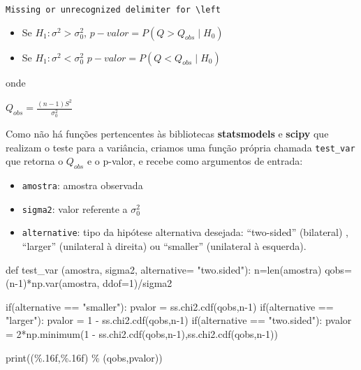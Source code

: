 \documentclass[
  letterpaper,
  DIV=11,
  numbers=noendperiod]{scrreprt}
\newenvironment{Shaded}{\begin{snugshade}}{\end{snugshade}}
\newcommand{\BuiltInTok}[1]{\textcolor[rgb]{0.00,0.23,0.31}{#1}}
\newcommand{\ControlFlowTok}[1]{\textcolor[rgb]{0.00,0.23,0.31}{#1}}
\newcommand{\DecValTok}[1]{\textcolor[rgb]{0.68,0.00,0.00}{#1}}
\newcommand{\KeywordTok}[1]{\textcolor[rgb]{0.00,0.23,0.31}{#1}}
\newcommand{\NormalTok}[1]{\textcolor[rgb]{0.00,0.23,0.31}{#1}}
\newcommand{\OperatorTok}[1]{\textcolor[rgb]{0.37,0.37,0.37}{#1}}
\newcommand{\SpecialCharTok}[1]{\textcolor[rgb]{0.37,0.37,0.37}{#1}}
\newcommand{\StringTok}[1]{\textcolor[rgb]{0.13,0.47,0.30}{#1}}
\providecommand{\tightlist}{%
  \setlength{\itemsep}{0pt}\setlength{\parskip}{0pt}}\usepackage{longtable,booktabs,array}
\begin{document}
\texttt{Missing\ or\ unrecognized\ delimiter\ for\ \textbackslash{}left}

\begin{itemize}
\item
  Se \(H_{1}: \sigma^{2} > \sigma^{2}_{0}\),
  \(p-valor = P (Q > Q_{obs}\mid H_{0})\)
\item
  Se \(H_{1}: \sigma^{2} < \sigma^{2}_{0}\)
  \(p-valor = P (Q < Q_{obs}\mid H_{0})\)
\end{itemize}

onde

\(Q_{obs} = \frac{(n-1)S^{2}}{\sigma_{0}^{2}}\)

Como não há funções pertencentes às bibliotecas \textbf{statsmodels} e
\textbf{scipy} que realizam o teste para a variância, criamos uma função
própria chamada \texttt{test\_var} que retorna o \(Q_{obs}\) e o
p-valor, e recebe como argumentos de entrada:

\begin{itemize}
\tightlist
\item
  \texttt{amostra}: amostra observada
\item
  \texttt{sigma2}: valor referente a \(\sigma^{2}_{0}\)
\item
  \texttt{alternative}: tipo da hipótese alternativa desejada:
  ``two-sided'' (bilateral) , ``larger'' (unilateral à direita) ou
  ``smaller'' (unilateral à esquerda).
\end{itemize}

\begin{Shaded}
\begin{Highlighting}[]
\KeywordTok{def}\NormalTok{ test\_var (amostra, sigma2, alternative}\OperatorTok{=} \StringTok{"two.sided"}\NormalTok{):}
\NormalTok{    n}\OperatorTok{=}\BuiltInTok{len}\NormalTok{(amostra)}
\NormalTok{    qobs}\OperatorTok{=}\NormalTok{ (n}\OperatorTok{{-}}\DecValTok{1}\NormalTok{)}\OperatorTok{*}\NormalTok{np.var(amostra, ddof}\OperatorTok{=}\DecValTok{1}\NormalTok{)}\OperatorTok{/}\NormalTok{sigma2}
    
    \ControlFlowTok{if}\NormalTok{(alternative }\OperatorTok{==} \StringTok{"smaller"}\NormalTok{):}
\NormalTok{        pvalor }\OperatorTok{=}\NormalTok{ ss.chi2.cdf(qobs,n}\OperatorTok{{-}}\DecValTok{1}\NormalTok{)}
    \ControlFlowTok{if}\NormalTok{(alternative }\OperatorTok{==} \StringTok{"larger"}\NormalTok{):}
\NormalTok{        pvalor }\OperatorTok{=} \DecValTok{1} \OperatorTok{{-}}\NormalTok{ ss.chi2.cdf(qobs,n}\OperatorTok{{-}}\DecValTok{1}\NormalTok{)}
    \ControlFlowTok{if}\NormalTok{(alternative }\OperatorTok{==} \StringTok{"two.sided"}\NormalTok{):}
\NormalTok{        pvalor }\OperatorTok{=} \DecValTok{2}\OperatorTok{*}\NormalTok{np.minimum(}\DecValTok{1} \OperatorTok{{-}}\NormalTok{ ss.chi2.cdf(qobs,n}\OperatorTok{{-}}\DecValTok{1}\NormalTok{),ss.chi2.cdf(qobs,n}\OperatorTok{{-}}\DecValTok{1}\NormalTok{))}
        
    \BuiltInTok{print}\NormalTok{(}\StringTok{\textquotesingle{}(}\SpecialCharTok{\%.16f}\StringTok{,}\SpecialCharTok{\%.16f}\StringTok{)\textquotesingle{}} \OperatorTok{\%}\NormalTok{ (qobs,pvalor))}
\end{Highlighting}
\end{Shaded}
\end{document}
